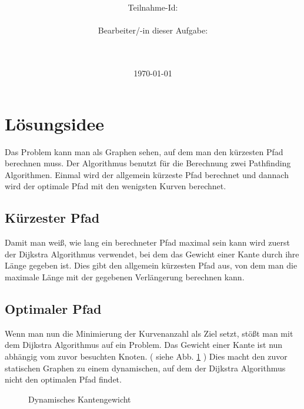 \documentclass[a4paper,10pt,ngerman]{scrartcl}
\title{\textbf{\Huge\Aufgabe}}
\author{\LARGE Teilnahme-Id: \LARGE \TeilnahmeId \\\\
	    \LARGE Bearbeiter/-in dieser Aufgabe: \\ 
	    \LARGE \Namen\\\\}
\date{\LARGE\today}
\newcommand{\abbref}[1]{
  siehe Abb. \ref{#1}
}
\begin{document}
\maketitle
\newpage

\tableofcontents
\newpage

\section{Lösungsidee}
Das Problem kann man als Graphen sehen, auf dem man den kürzesten Pfad berechnen muss.
Der Algorithmus benutzt für die Berechnung zwei Pathfinding Algorithmen. Einmal wird der allgemein kürzeste Pfad berechnet und
dannach wird der optimale Pfad mit den wenigsten Kurven berechnet.

\subsection{Kürzester Pfad}
Damit man weiß, wie lang ein berechneter Pfad maximal sein kann wird zuerst der Dijkstra Algorithmus verwendet, bei dem das
Gewicht einer Kante durch ihre Länge gegeben ist. Dies gibt den allgemein kürzesten Pfad aus, von dem man die maximale
Länge mit der gegebenen Verlängerung berechnen kann.

\subsection{Optimaler Pfad}
Wenn man nun die Minimierung der Kurvenanzahl als Ziel setzt, stößt man mit dem Dijkstra Algorithmus auf ein Problem. Das Gewicht
einer Kante ist nun abhängig vom zuvor besuchten Knoten. (\abbref{fig:dynamicweight})
Dies macht den zuvor statischen Graphen zu einem dynamischen, auf dem der Dijkstra Algorithmus nicht den optimalen Pfad findet.

\begin{figure}[ht]
  \centering
  \caption{Dynamisches Kantengewicht}
  \label{fig:dynamicweight}
\end{figure}
\end{document}
